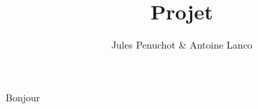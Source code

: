 \documentclass{article}
\title{Projet}
\author{Jules Penuchot \& Antoine Lanco}
\begin{document}
\maketitle
Bonjour
\end{document}
